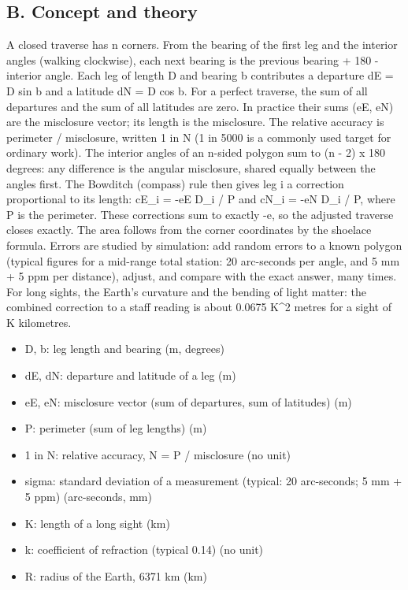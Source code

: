 \documentclass[11pt,a4paper]{article}
\begin{document}
\subsection*{B. Concept and theory}
A closed traverse has n corners. From the bearing of the first leg and the interior angles (walking clockwise), each next bearing is the previous bearing + 180 - interior angle. Each leg of length D and bearing b contributes a departure dE = D sin b and a latitude dN = D cos b. For a perfect traverse, the sum of all departures and the sum of all latitudes are zero. In practice their sums (eE, eN) are the misclosure vector; its length is the misclosure. The relative accuracy is perimeter / misclosure, written 1 in N (1 in 5000 is a commonly used target for ordinary work). The interior angles of an n-sided polygon sum to (n - 2) x 180 degrees: any difference is the angular misclosure, shared equally between the angles first. The Bowditch (compass) rule then gives leg i a correction proportional to its length: cE\_i = -eE D\_i / P and cN\_i = -eN D\_i / P, where P is the perimeter. These corrections sum to exactly -e, so the adjusted traverse closes exactly. The area follows from the corner coordinates by the shoelace formula. Errors are studied by simulation: add random errors to a known polygon (typical figures for a mid-range total station: 20 arc-seconds per angle, and 5 mm + 5 ppm per distance), adjust, and compare with the exact answer, many times. For long sights, the Earth's curvature and the bending of light matter: the combined correction to a staff reading is about 0.0675 K\textasciicircum{}2 metres for a sight of K kilometres.

\begin{itemize}[nosep]
\item D, b: leg length and bearing (m, degrees)
\item dE, dN: departure and latitude of a leg (m)
\item eE, eN: misclosure vector (sum of departures, sum of latitudes) (m)
\item P: perimeter (sum of leg lengths) (m)
\item 1 in N: relative accuracy, N = P / misclosure (no unit)
\item sigma: standard deviation of a measurement (typical: 20 arc-seconds; 5 mm + 5 ppm) (arc-seconds, mm)
\item K: length of a long sight (km)
\item k: coefficient of refraction (typical 0.14) (no unit)
\item R: radius of the Earth, 6371 km (km)
\end{itemize}
\end{document}
